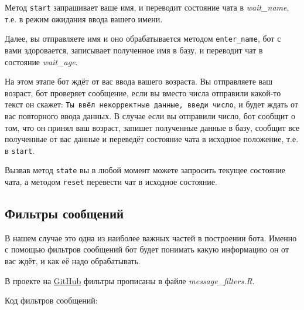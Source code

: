 \documentclass[
]{book}
\newenvironment{Shaded}{\begin{snugshade}}{\end{snugshade}}
\newcommand{\CommentTok}[1]{\textcolor[rgb]{0.56,0.35,0.01}{\textit{#1}}}
\newcommand{\ControlFlowTok}[1]{\textcolor[rgb]{0.13,0.29,0.53}{\textbf{#1}}}
\newcommand{\FunctionTok}[1]{\textcolor[rgb]{0.13,0.29,0.53}{\textbf{#1}}}
\newcommand{\NormalTok}[1]{#1}
\newcommand{\OtherTok}[1]{\textcolor[rgb]{0.56,0.35,0.01}{#1}}
\newcommand{\SpecialCharTok}[1]{\textcolor[rgb]{0.81,0.36,0.00}{\textbf{#1}}}
\newcommand{\StringTok}[1]{\textcolor[rgb]{0.31,0.60,0.02}{#1}}
\begin{document}
Метод \texttt{start} запрашивает ваше имя, и переводит состояние чата в \emph{wait\_name}, т.е. в режим ожидания ввода вашего имени.

Далее, вы отправляете имя и оно обрабатывается методом \texttt{enter\_name}, бот с вами здоровается, записывает полученное имя в базу, и переводит чат в состояние \emph{wait\_age}.

На этом этапе бот ждёт от вас ввода вашего возраста. Вы отправляете ваш возраст, бот проверяет сообщение, если вы вместо числа отправили какой-то текст он скажет: \texttt{Ты\ ввёл\ некорректные\ данные,\ введи\ число}, и будет ждать от вас повторного ввода данных. В случае если вы отправили число, бот сообщит о том, что он принял ваш возраст, запишет полученные данные в базу, сообщит все полученные от вас данные и переведёт состояние чата в исходное положение, т.е. в \texttt{start}.

Вызвав метод \texttt{state} вы в любой момент можете запросить текущее состояние чата, а методом \texttt{reset} перевести чат в исходное состояние.

\subsection{Фильтры сообщений}\label{ux444ux438ux43bux44cux442ux440ux44b-ux441ux43eux43eux431ux449ux435ux43dux438ux439}

В нашем случае это одна из наиболее важных частей в построении бота. Именно с помощью фильтров сообщений бот будет понимать какую информацию он от вас ждёт, и как её надо обрабатывать.

В проекте на \href{https://github.com/selesnow/logical_tg_bot}{GitHub} фильтры прописаны в файле \emph{message\_filters.R}.

Код фильтров сообщений:

\begin{Shaded}
\end{Shaded}
\end{document}
